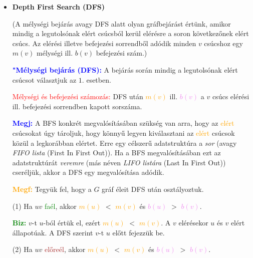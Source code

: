 \documentclass[../../szobeli.tex]{subfiles}
\begin{document}
\begin{center}
    \noindent{}
\end{center}

    \begin{itemize}
        \item \textbf{Depth First Search (DFS)}
        
        (A mélységi bejárás avagy DFS alatt olyan gráfbejárást értünk, amikor mindig a legutolsónak elért csúcsból kerül elérésre a soron következőnek elért csúcs. Az elérési illetve befejezési sorrendből adódik minden $v$ csúcshoz egy $m(v)$ mélységi ill. $b(v)$ befejezési szám.)

        \textcolor{blue}{\textbf{"Mélységi bejárás (DFS):}} A bejárás során mindig a legutolsónak elért csúcsot választjuk az $\boxed{1.}$ esetben.

        \textcolor{red}{Mélységi és befejezési számozás:} DFS után \textcolor{orange}{$m(v)$} ill. \textcolor{violet}{$b(v)$} a $v$ csúcs elérési ill. befejezési sorrendben kapott sorszáma.

        \textcolor{blue}{\textbf{Megj:}} A BFS konkrét megvalósításában szükség van arra, hogy az \textcolor{orange}{elért} csúcsokat úgy tároljuk, hogy könnyű legyen kiválasztani az \textcolor{orange}{elért} csúcsok közül a legkorábban elértet. Erre egy célszerű adatstruktúra a \textit{sor} (avagy \textit{FIFO lista} (First In First Out)). Ha a BFS megvalósításában ezt az adatstruktúrát \textit{veremre} (más néven \textit{LIFO listára} (Last In First Out)) cseréljük, akkor a DFS egy megvalósítása adódik.

        \textcolor{orange}{\textbf{Megf:}} Tegyük fel, hogy a $G$ gráf éleit DFS után osztályoztuk. 
        
        (1) Ha $uv$ \textcolor{green}{faél}, akkor \textcolor{orange}{$m(u)$} $<$ \textcolor{orange}{$m(v)$} és \textcolor{violet}{$b(u)$} $>$ \textcolor{violet}{$b(v)$}.

        \textcolor{green}{\textbf{Biz:}} $v$-t $u$-ból értük el, ezért \textcolor{orange}{$m(u)$} $<$ \textcolor{orange}{$m(v)$}. A $v$ elérésekor $u$ és $v$ elért állapotúak. A DFS szerint $v$-t $u$ előtt fejezzük be.   

        (2) Ha $uv$ \textcolor{brown}{előreél}, akkor \textcolor{orange}{$m(u)$} $<$ \textcolor{orange}{$m(v)$} és \textcolor{violet}{$b(u)$} $>$ \textcolor{violet}{$b(v)$}.


\end{itemize}
\end{document}
